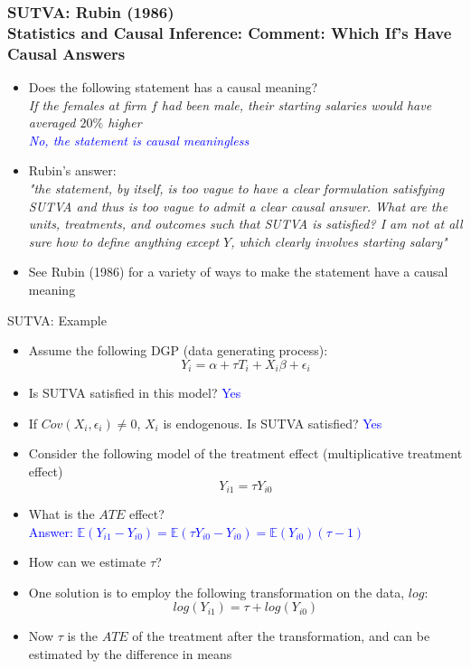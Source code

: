 \documentclass[handout]{beamer}
\theoremstyle{definition}
\begin{document}
\begin{frame}[t]\frametitle{SUTVA: Rubin (1986) \\ \small 
Statistics and Causal Inference: Comment: Which If's Have Causal Answers}
		\begin{itemize}
			\item Does the following statement has a causal meaning?\\
			\textit{If the females at firm $f$ had been male, their 
starting salaries would have averaged $20\%$ higher}\\ \pause
			 \textcolor{blue}{\textit{No, the statement is causal meaningless}}			 
			\item Rubin's answer: \\ \pause
			\emph{"the statement, by itself, is too
vague to have a clear formulation satisfying SUTVA and
thus is too vague to admit a clear causal answer. What are
the units, treatments, and outcomes such that SUTVA is
satisfied? I am not at all sure how to define anything except
$Y$, which clearly involves starting salary"} \pause
		\item See Rubin (1986) for a variety of ways to make the statement have a causal meaning 
		\end{itemize}
	\end{frame}


\begin{frame}{SUTVA: Example}
\begin{itemize}
\item Assume the following DGP (data generating process):
\[ Y_i =\alpha+\tau T_i +X_i \beta + \epsilon_i \]
\item Is SUTVA satisfied in this model? \pause \textcolor{blue}{Yes}
\item If $Cov(X_i,\epsilon_i)\neq 0$, $X_i$ is endogenous. Is SUTVA satisfied? \pause \textcolor{blue}{Yes}
\end{itemize}
\end{frame}


\begin{frame}
\begin{itemize}
\item Consider the following model of the treatment effect (multiplicative treatment effect)
$$ Y_{i1} = \tau Y_{i0} $$
\item What is the $ATE$ effect?\\ \pause
\textcolor{blue}{Answer: $\mathbb{E}(Y_{i1} - Y_{i0}) = \mathbb{E}(\tau Y_{i0} - Y_{i0}) 
= \mathbb{E}(Y_{i0})(\tau -1)$} \pause
\item How can we estimate $\tau$? \pause 
\item One solution is to employ the following transformation on the data, $log$:
$$ log(Y_{i1}) = \tau+log(Y_{i0})$$
\pause
\item Now $\tau$ is the $ATE$ of the treatment after the transformation, and can be estimated by the difference in means
\end{itemize}
\end{frame}
\end{document}

